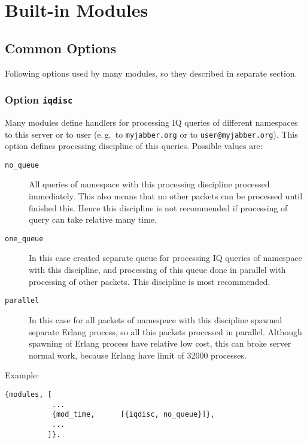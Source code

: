 \documentclass[10pt]{article}
\begin{document}
\appendix{}

\section{Built-in Modules}
\label{sec:modules}



\subsection{Common Options}
\label{sec:modcommonopts}

Following options used by many modules, so they described in separate section.


\subsubsection{Option \texttt{iqdisc}}

Many modules define handlers for processing IQ queries of different namespaces
to this server or to user (e.\,g.\ to \texttt{myjabber.org} or to
\texttt{user@myjabber.org}).  This option defines processing discipline of this
queries.  Possible values are:
\begin{description}
\item[\texttt{no\_queue}] All queries of namespace with this processing
  discipline processed immediately.  This also means that no other packets can
  be processed until finished this.  Hence this discipline is not recommended
  if processing of query can take relative many time.
\item[\texttt{one\_queue}] In this case created separate queue for processing
  IQ queries of namespace with this discipline, and processing of this queue
  done in parallel with processing of other packets. This discipline is most
  recommended.
\item[\texttt{parallel}] In this case for all packets of namespace with this
  discipline spawned separate Erlang process, so all this packets processed in
  parallel.  Although spawning of Erlang process have relative low cost, this
  can broke server normal work, because Erlang have limit of 32000 processes.
\end{description}

Example:
\begin{verbatim}
{modules, [
           ...
           {mod_time,      [{iqdisc, no_queue}]},
           ...
          ]}.
\end{verbatim}
\end{document}
